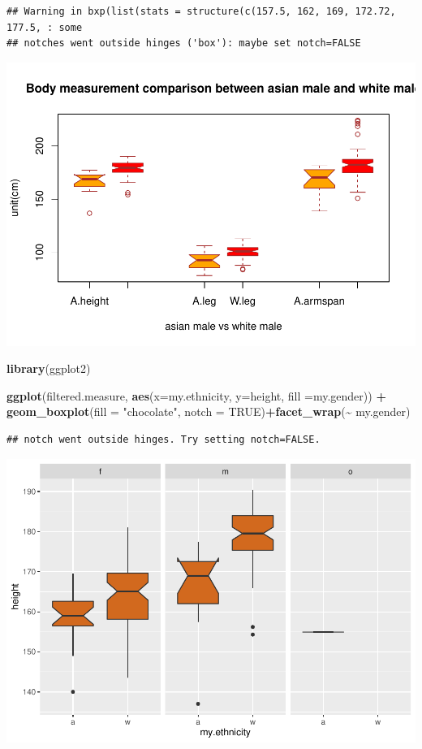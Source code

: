 \documentclass[]{article}
\newenvironment{Shaded}{\begin{snugshade}}{\end{snugshade}}
\newcommand{\DataTypeTok}[1]{\textcolor[rgb]{0.13,0.29,0.53}{#1}}
\newcommand{\KeywordTok}[1]{\textcolor[rgb]{0.13,0.29,0.53}{\textbf{#1}}}
\newcommand{\NormalTok}[1]{#1}
\newcommand{\OperatorTok}[1]{\textcolor[rgb]{0.81,0.36,0.00}{\textbf{#1}}}
\newcommand{\OtherTok}[1]{\textcolor[rgb]{0.56,0.35,0.01}{#1}}
\newcommand{\StringTok}[1]{\textcolor[rgb]{0.31,0.60,0.02}{#1}}
\begin{document}
\begin{verbatim}
## Warning in bxp(list(stats = structure(c(157.5, 162, 169, 172.72, 177.5, : some
## notches went outside hinges ('box'): maybe set notch=FALSE
\end{verbatim}

\includegraphics{project-measure_files/figure-latex/box_plots-6.pdf}

\begin{Shaded}
\begin{Highlighting}[]
\KeywordTok{library}\NormalTok{(ggplot2)}

\KeywordTok{ggplot}\NormalTok{(filtered.measure, }\KeywordTok{aes}\NormalTok{(}\DataTypeTok{x=}\NormalTok{my.ethnicity, }\DataTypeTok{y=}\NormalTok{height, }\DataTypeTok{fill =}\NormalTok{my.gender)) }\OperatorTok{+}
\StringTok{  }\KeywordTok{geom\_boxplot}\NormalTok{(}\DataTypeTok{fill =} \StringTok{"chocolate"}\NormalTok{, }\DataTypeTok{notch =} \OtherTok{TRUE}\NormalTok{)}\OperatorTok{+}\KeywordTok{facet\_wrap}\NormalTok{(}\OperatorTok{\textasciitilde{}}\StringTok{ }\NormalTok{my.gender)}
\end{Highlighting}
\end{Shaded}

\begin{verbatim}
## notch went outside hinges. Try setting notch=FALSE.
\end{verbatim}

\includegraphics{project-measure_files/figure-latex/gg_boxplots-1.pdf}
\end{document}
